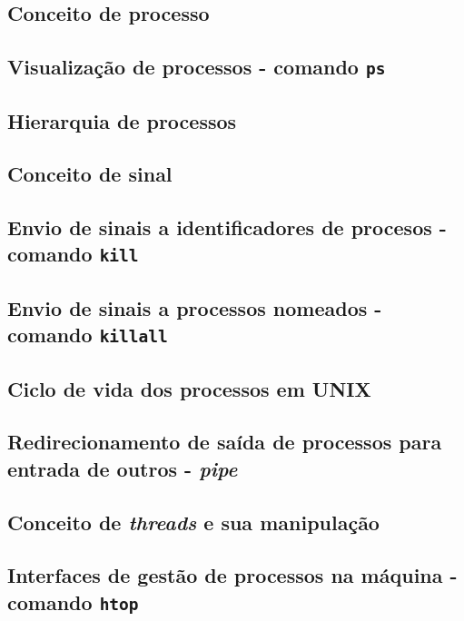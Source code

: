 \documentclass[a4paper, onecolumn, 10pt]{report}
\begin{document}
\subsection{Conceito de processo}

\subsection{Visualização de processos - comando \texttt{ps}}

\subsection{Hierarquia de processos}

\subsection{Conceito de sinal}

\subsection{Envio de sinais a identificadores de procesos - comando \texttt{kill}}

\subsection{Envio de sinais a processos nomeados - comando \texttt{killall}}

\subsection{Ciclo de vida dos processos em UNIX}

\subsection{Redirecionamento de saída de processos para entrada de outros - \textit{pipe}}

\subsection{Conceito de \textit{threads} e sua manipulação}

\subsection{Interfaces de gestão de processos na máquina - comando \texttt{htop}}
\end{document}
